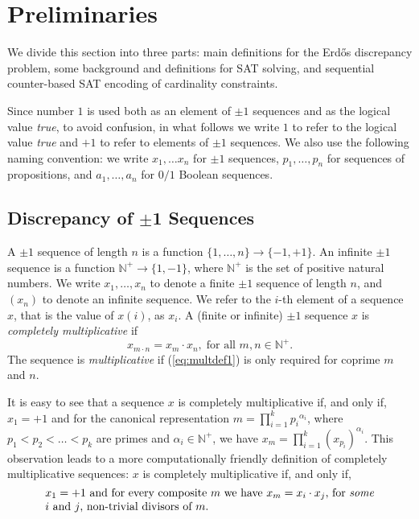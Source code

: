 \documentclass{article} \usepackage[utf8]{inputenc}
\newcommand*{\natP}{\ensuremath{\mathbb{N}^{+}}}
\begin{document}
\section{Preliminaries}\label{sec:preliminaries}
We divide this section into three parts: main definitions for the Erd\H{o}s 
discrepancy problem, some background and definitions for SAT solving, and
sequential counter-based SAT encoding of cardinality constraints.

Since number $1$ is used both as an element of $\pm1$ sequences and 
as the logical value \emph{true}, to avoid confusion,  in what follows we write
$1$ to refer to the logical value \emph{true} and $+1$ to refer to elements of
$\pm1$ sequences.  We also use the following naming convention: we write
$x_1,\dots x_n$ for $\pm1$ sequences, $p_1,\dots, p_n$ for sequences of
propositions, and $a_1,\dots, a_n$ for $0/1$ Boolean sequences.


\subsection{Discrepancy of $\pm$1 Sequences}
A $\pm1$ sequence of length $n$ is a function $\{1,\dots,n\}\to\{-1,+1\}$.  An
infinite $\pm1$ sequence is a function $\natP\to\{1,-1\}$, where $\natP$ is the
set of positive natural numbers.  We write $x_1,\dots, x_n$ to denote a finite
$\pm1$ sequence of length $n$, and $(x_n)$ to denote an infinite sequence. We
refer to  the $i$-th element of a sequence $x$, that is the value of $x(i)$,
as $x_i$. 
A (finite or infinite) $\pm1$ sequence $x$ is \emph{completely multiplicative} \cite{apostol} if
\begin{equation}\label{eq:multdef1}
        x_{m\cdot n} = x_m\cdot x_n,\; \textrm{for all $m,n\in \natP$.}
\end{equation}
The sequence is \emph{multiplicative} if (\ref{eq:multdef1}) is only required
for 
coprime $m$ and $n$.

It is easy to see that a sequence $x$ is
completely multiplicative if, and only if, $x_1 = +1$ and for
the canonical representation  $m = \prod_{i=1}^{k} {p_i}^{\alpha_i}$, where $p_1<
p_2<\dots< p_k$ are primes and $\alpha_i\in\natP$, 
we have $x_{m} = \prod_{i=1}^k (x_{p_i})^{\alpha_i}$.
This observation leads to a more computationally friendly definition of
completely multiplicative sequences: $x$ is completely multiplicative if,
and only if,
\begin{equation}\label{eq:multdef2}
\begin{minipage}{0.85\textwidth}$x_1 = +1$ and for every composite $m$ we have $x_m = x_i\cdot x_j$, for \emph{some}
$i$ and $j$, non-trivial divisors of $m$.
\end{minipage}
\end{equation}
\end{document}
